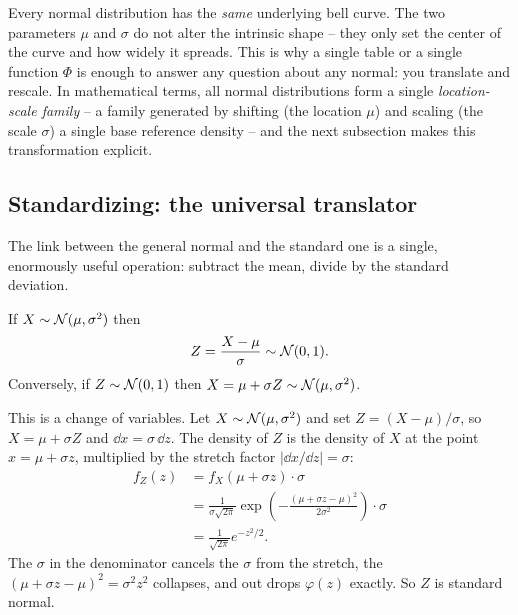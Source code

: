 \begin{happeningbox}
Every normal distribution has the \emph{same} underlying bell curve. The two
parameters $\mu$ and $\sigma$ do not alter the intrinsic shape -- they only set
the center of the curve and how widely it spreads. This is why a single table or
a single function $\Phi$ is enough to answer any question about any normal: you
translate and rescale. In mathematical terms, all normal distributions form
a single \emph{location-scale family} -- a family generated by shifting
(the location $\mu$) and scaling (the scale $\sigma$) a single base reference
density -- and the next subsection makes this transformation explicit.
\end{happeningbox}

\subsection{Standardizing: the universal translator}
\label{ch12:standardize}

The link between the general normal and the standard one is a single, enormously
useful operation: subtract the mean, divide by the standard deviation.

\begin{theorem}[Standardization]
\label{ch12:thm-standardize}
If $X \sim \mathcal{N}(\mu, \sigma^2)$ then
\[
  Z = \frac{X - \mu}{\sigma} \sim \mathcal{N}(0,1).
\]
Conversely, if $Z \sim \mathcal{N}(0,1)$ then $X = \mu + \sigma Z \sim \mathcal{N}(\mu,\sigma^2)$.
\end{theorem}

\begin{whybox}
This is a change of variables. Let $X \sim \mathcal{N}(\mu,\sigma^2)$ and set
$Z = (X-\mu)/\sigma$, so $X = \mu + \sigma Z$ and $\dd x = \sigma\,\dd z$. The
density of $Z$ is the density of $X$ at the point $x = \mu + \sigma z$, multiplied
by the stretch factor $|\dd x/\dd z| = \sigma$:
\begin{align*}
  f_Z(z) &= f_X(\mu + \sigma z)\cdot \sigma \\
         &= \frac{1}{\sigma\sqrt{2\pi}}\exp\!\left(-\frac{(\mu+\sigma z - \mu)^2}{2\sigma^2}\right)\cdot \sigma \\
         &= \frac{1}{\sqrt{2\pi}} e^{-z^2/2}.
\end{align*}
The $\sigma$ in the denominator cancels the $\sigma$ from the stretch, the
$(\mu + \sigma z - \mu)^2 = \sigma^2 z^2$ collapses, and out drops $\varphi(z)$
exactly. So $Z$ is standard normal.
\end{whybox}

